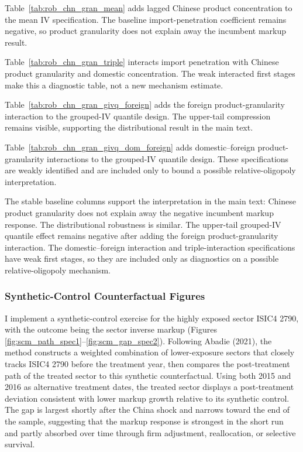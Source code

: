 ﻿\documentclass[12pt]{article}
\begin{document}


Table~\ref{tab:rob_chn_gran_mean} adds lagged Chinese product concentration to the mean IV specification. The baseline import-penetration coefficient remains negative, so product granularity does not explain away the incumbent markup result.



Table~\ref{tab:rob_chn_gran_triple} interacts import penetration with Chinese product granularity and domestic concentration. The weak interacted first stages make this a diagnostic table, not a new mechanism estimate.



Table~\ref{tab:rob_chn_gran_givq_foreign} adds the foreign product-granularity interaction to the grouped-IV quantile design. The upper-tail compression remains visible, supporting the distributional result in the main text.



Table~\ref{tab:rob_chn_gran_givq_dom_foreign} adds domestic--foreign product-granularity interactions to the grouped-IV quantile design. These specifications are weakly identified and are included only to bound a possible relative-oligopoly interpretation.

The stable baseline columns support the interpretation in the main text: Chinese product granularity does not explain away the negative incumbent markup response. The distributional robustness is similar. The upper-tail grouped-IV quantile effect remains negative after adding the foreign product-granularity interaction. The domestic--foreign interaction and triple-interaction specifications have weak first stages, so they are included only as diagnostics on a possible relative-oligopoly mechanism.



\small
\renewcommand{\arraystretch}{1}
\subsubsection{Synthetic-Control Counterfactual Figures}

I implement a synthetic-control exercise for the highly exposed sector ISIC4 2790, with the outcome being the sector inverse markup (Figures \ref{fig:scm_path_spec1}--\ref{fig:scm_gap_spec2}). Following Abadie (2021), the method constructs a weighted combination of lower-exposure sectors that closely tracks ISIC4 2790 before the treatment year, then compares the post-treatment path of the treated sector to this synthetic counterfactual. Using both 2015 and 2016 as alternative treatment dates, the treated sector displays a post-treatment deviation consistent with lower markup growth relative to its synthetic control. The gap is largest shortly after the China shock and narrows toward the end of the sample, suggesting that the markup response is strongest in the short run and partly absorbed over time through firm adjustment, reallocation, or selective survival.
\end{document}
